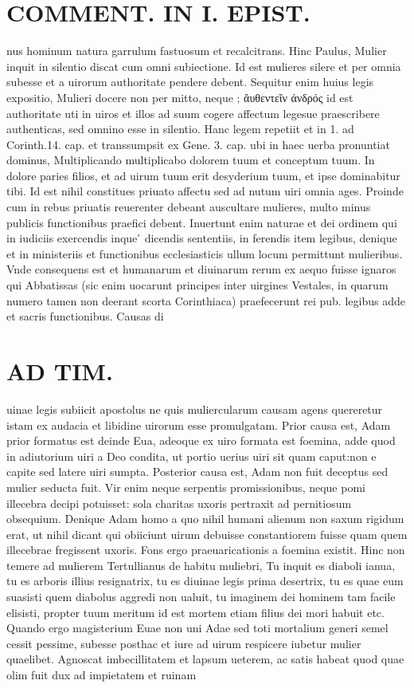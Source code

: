 \documentclass{article}
\begin{document}
\begin{pages}
\section*{COMMENT. IN I. EPIST. }\pstart nus hominum natura garrulum fastuosum et recalcitrans. Hinc Paulus, Mulier inquit in silentio discat cum omni subiectione. Id est mulieres silere et per omnia subesse et a uirorum authoritate pendere debent. Sequitur enim huius legis expositio, Mulieri docere non per mitto, neque ; ἄυθεντεῖν ἀνδρός id est authoritate uti in uiros et illos ad suum cogere affectum legesue praescribere authenticas, sed omnino esse in silentio. Hanc legem repetiit et in 1. ad Corinth.14. cap. et transsumpsit ex Gene. 3. cap. ubi in haec uerba pronuntiat dominus, Multiplicando multiplicabo dolorem tuum et conceptum tuum. In dolore paries filios, et ad uirum tuum erit desyderium tuum, et ipse dominabitur tibi. Id est nihil constitues priuato affectu sed ad nutum uiri omnia ages. Proinde cum in rebus priuatis reuerenter debeant auscultare mulieres, multo minus publicis functionibus praefici debent. Inuertunt enim naturae et dei ordinem qui in iudiciis exercendis inque ́ dicendis sententiis, in ferendis item legibus, denique  et in ministeriis et functionibus ecclesiasticis ullum locum permittunt mulieribus. Vnde consequens est et humanarum et diuinarum rerum ex aequo fuisse ignaros qui Abbatissas (sic enim uocarunt principes inter uirgines Vestales, in quarum numero tamen non deerant scorta Corinthiaca) praefecerunt rei pub. legibus adde et sacris functionibus. Causas di\pend
\section*{AD TIM. }
\marginpar{[ p.121 ]}\pstart uinae legis subiicit apostolus ne quis muliercularum causam agens quereretur istam ex audacia et libidine uirorum esse promulgatam. Prior causa est, Adam prior formatus est deinde Eua, adeoque ex uiro formata est foemina, adde quod in adiutorium uiri a Deo condita, ut portio uerius uiri sit quam caput:non e capite sed latere uiri sumpta. Posterior causa est, Adam non fuit deceptus sed mulier seducta fuit. Vir enim neque  serpentis promissionibus, neque pomi illecebra decipi potuisset: sola charitas uxoris pertraxit ad pernitiosum obsequium. Denique Adam homo a quo nihil humani alienum non saxum rigidum erat, ut nihil dicant qui obiiciunt uirum debuisse constantiorem fuisse quam quem illecebrae fregissent uxoris. Fons ergo praeuaricationis a foemina existit. Hinc non temere ad mulierem Tertullianus de habitu muliebri, Tu inquit es diaboli ianua, tu es arboris illius resignatrix, tu es diuinae legis prima desertrix, tu es quae eum suasisti quem diabolus aggredi non ualuit, tu imaginem dei hominem tam facile elisisti, propter tuum meritum id est mortem etiam filius dei mori habuit etc. Quando ergo magisterium Euae non uni Adae sed toti mortalium generi semel cessit pessime, subesse posthac et iure ad uirum respicere iubetur mulier quaelibet. Agnoscat imbecillitatem et lapsum ueterem, ac satis habeat quod quae olim fuit dux ad impietatem et ruinam  \pend

\end{pages}
\end{document}
